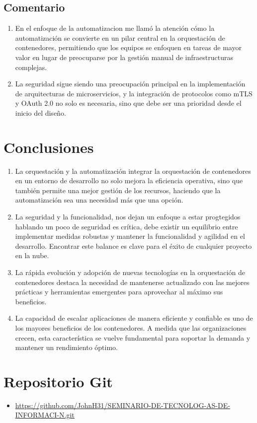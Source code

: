 \documentclass[12pt]{article}
\begin{document}
\subsection*{Comentario}
\begin{enumerate}
    \item En el enfoque de la automatizacion me llamó la atención cómo la automatización se convierte en un pilar central en la orquestación de contenedores, permitiendo que los equipos se enfoquen en tareas de mayor valor en lugar de preocuparse por la gestión manual de infraestructuras complejas.
    \item La seguridad sigue siendo una preocupación principal en la implementación de arquitecturas de microservicios, y la integración de protocolos como mTLS y OAuth 2.0 no solo es necesaria, sino que debe ser una prioridad desde el inicio del diseño.
\end{enumerate}

\section*{Conclusiones}
\begin{enumerate}
    \item La orquestación y la automatización integrar la orquestación de contenedores en un entorno de desarrollo no solo mejora la eficiencia operativa, sino que también permite una mejor gestión de los recursos, haciendo que la automatización sea una necesidad más que una opción.
    \item La seguridad y la funcionalidad, nos dejan un enfoque a estar progtegidos hablando un poco de seguridad es crítica, debe existir un equilibrio entre implementar medidas robustas y mantener la funcionalidad y agilidad en el desarrollo. Encontrar este balance es clave para el éxito de cualquier proyecto en la nube.
    \item La rápida evolución y adopción de nuevas tecnologías en la orquestación de contenedores destaca la necesidad de mantenerse actualizado con las mejores prácticas y herramientas emergentes para aprovechar al máximo sus beneficios.
    \item La capacidad de escalar aplicaciones de manera eficiente y confiable es uno de los mayores beneficios de los contenedores. A medida que las organizaciones crecen, esta característica se vuelve fundamental para soportar la demanda y mantener un rendimiento óptimo.
\end{enumerate}




\section*{Repositorio Git}
\begin{itemize}
    \item \url{https://github.com/JohnH31/SEMINARIO-DE-TECNOLOG-AS-DE-INFORMACI-N.git}
\end{itemize}
\end{document}
